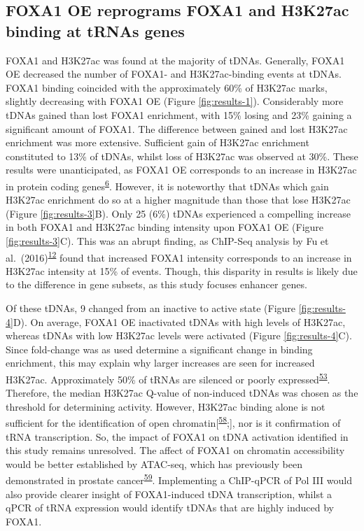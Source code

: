 \documentclass[
  12pt,
]{article}
\begin{document}
\hypertarget{foxa1-oe-reprograms-foxa1-and-h3k27ac-binding-at-trnas-genes}{%
\subsection{FOXA1 OE reprograms FOXA1 and H3K27ac binding at tRNAs genes}\label{foxa1-oe-reprograms-foxa1-and-h3k27ac-binding-at-trnas-genes}}

FOXA1 and H3K27ac was found at the majority of tDNAs.
Generally, FOXA1 OE decreased the number of FOXA1- and H3K27ac-binding events at tDNAs.
FOXA1 binding coincided with the approximately 60\% of H3K27ac marks, slightly decreasing with FOXA1 OE (Figure \ref{fig:results-1}).
Considerably more tDNAs gained than lost FOXA1 enrichment, with 15\% losing and 23\% gaining a significant amount of FOXA1.
The difference between gained and lost H3K27ac enrichment was more extensive.
Sufficient gain of H3K27ac enrichment constituted to 13\% of tDNAs, whilst loss of H3K27ac was observed at 30\%.
These results were unanticipated, as FOXA1 OE corresponds to an increase in H3K27ac in protein coding genes\textsuperscript{\protect\hyperlink{ref-Cirillo2002}{6}}.
However, it is noteworthy that tDNAs which gain H3K27ac enrichment do so at a higher magnitude than those that lose H3K27ac (Figure \ref{fig:results-3}B).
Only 25 (6\%) tDNAs experienced a compelling increase in both FOXA1 and H3K27ac binding intensity upon FOXA1 OE (Figure \ref{fig:results-3}C).
This was an abrupt finding, as ChIP-Seq analysis by Fu et al.~(2016)\textsuperscript{\protect\hyperlink{ref-fu2016}{12}} found that increased FOXA1 intensity corresponds to an increase in H3K27ac intensity at 15\% of events.
Though, this disparity in results is likely due to the difference in gene subsets, as this study focuses enhancer genes.

Of these tDNAs, 9 changed from an inactive to active state (Figure \ref{fig:results-4}D).
On average, FOXA1 OE inactivated tDNAs with high levels of H3K27ac, whereas tDNAs with low H3K27ac levels were activated (Figure \ref{fig:results-4}C).
Since fold-change was as used determine a significant change in binding enrichment, this may explain why larger increases are seen for increased H3K27ac.
Approximately 50\% of tRNAs are silenced or poorly expressed\textsuperscript{\protect\hyperlink{ref-Torres2019}{53}}.
Therefore, the median H3K27ac Q-value of non-induced tDNAs was chosen as the threshold for determining activity.
However, H3K27ac binding alone is not sufficient for the identification of open chromatin{[}\textsuperscript{\protect\hyperlink{ref-Creyghton2010}{58}};{]}, nor is it confirmation of tRNA transcription.
So, the impact of FOXA1 on tDNA activation identified in this study remains unresolved.
The affect of FOXA1 on chromatin accessibility would be better established by ATAC-seq, which has previously been demonstrated in prostate cancer\textsuperscript{\protect\hyperlink{ref-Adams2019}{59}}.
Implementing a ChIP-qPCR of Pol III would also provide clearer insight of FOXA1-induced tDNA transcription, whilst a qPCR of tRNA expression would identify tDNAs that are highly induced by FOXA1.
\end{document}
